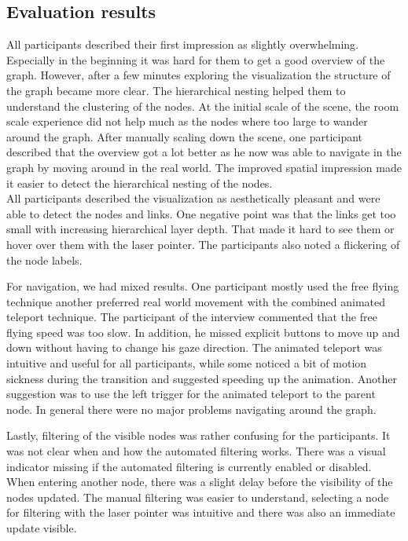 \subsection{Evaluation results}

All participants described their first impression as slightly overwhelming.
Especially in the beginning it was hard for them to get a good overview of the graph.
However, after a few minutes exploring the visualization the structure of the graph became more clear.
The hierarchical nesting helped them to understand the clustering of the nodes.
At the initial scale of the scene, the room scale experience did not help much as the nodes where too large to wander around the graph. 
After manually scaling down the scene, one participant described that the overview got a lot better as he now was able to navigate in the graph by moving around in the real world. 
The improved spatial impression made it easier to detect the hierarchical nesting of the nodes.
\\
All participants described the visualization as aesthetically pleasant and were able to detect the nodes and links. One negative point was that the links get too small with increasing hierarchical layer depth. That made it hard to see them or hover over them with the laser pointer.
The participants also noted a flickering of the node labels.  

For navigation, we had mixed results. One participant mostly used the free flying technique another preferred real world movement with the combined animated teleport technique.
The participant of the interview commented that the free flying speed was too slow. In addition, he missed explicit buttons to move up and down without having to change his gaze direction.
The animated teleport was intuitive and useful for all participants, while some noticed a bit of motion sickness during the transition and suggested speeding up the animation. Another suggestion was to use the left trigger for the animated teleport to the parent node.   
In general there were no major problems navigating around the graph. 

Lastly, filtering of the visible nodes was rather confusing for the participants. It was not clear when and how the automated filtering works.
There was a visual indicator missing if the automated filtering is currently enabled or disabled. 
When entering another node, there was a slight delay before the visibility of the nodes updated.
The manual filtering was easier to understand, selecting a node for filtering with the laser pointer was intuitive and there was also an immediate update visible.

